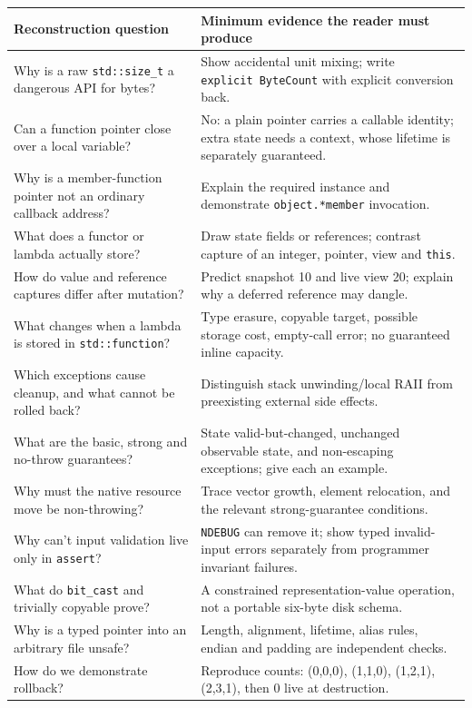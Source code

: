 {\def\LTcaptype{none} %
\begin{longtable}[]{@{}
  >{\raggedright\arraybackslash}p{}
  >{\raggedright\arraybackslash}p{}@{}}
\toprule\noalign{}
\begin{minipage}[b]{\linewidth}\raggedright
Reconstruction question
\end{minipage} & \begin{minipage}[b]{\linewidth}\raggedright
Minimum evidence the reader must produce
\end{minipage} \\
\midrule\noalign{}
\endhead
\bottomrule\noalign{}
\endlastfoot
Why is a raw \texttt{std::size\_t} a dangerous API for bytes? & Show accidental unit mixing; write \texttt{explicit\ ByteCount} with explicit conversion back. \\
Can a function pointer close over a local variable? & No: a plain pointer carries a callable identity; extra state needs a context, whose lifetime is separately guaranteed. \\
Why is a member-function pointer not an ordinary callback address? & Explain the required instance and demonstrate \texttt{object.*member} invocation. \\
What does a functor or lambda actually store? & Draw state fields or references; contrast capture of an integer, pointer, view and \texttt{this}. \\
How do value and reference captures differ after mutation? & Predict snapshot 10 and live view 20; explain why a deferred reference may dangle. \\
What changes when a lambda is stored in \texttt{std::function}? & Type erasure, copyable target, possible storage cost, empty-call error; no guaranteed inline capacity. \\
Which exceptions cause cleanup, and what cannot be rolled back? & Distinguish stack unwinding/local RAII from preexisting external side effects. \\
What are the basic, strong and no-throw guarantees? & State valid-but-changed, unchanged observable state, and non-escaping exceptions; give each an example. \\
Why must the native resource move be non-throwing? & Trace vector growth, element relocation, and the relevant strong-guarantee conditions. \\
Why can't input validation live only in \texttt{assert}? & \texttt{NDEBUG} can remove it; show typed invalid-input errors separately from programmer invariant failures. \\
What do \texttt{bit\_cast} and trivially copyable prove? & A constrained representation-value operation, not a portable six-byte disk schema. \\
Why is a typed pointer into an arbitrary file unsafe? & Length, alignment, lifetime, alias rules, endian and padding are independent checks. \\
How do we demonstrate rollback? & Reproduce counts: (0,0,0), (1,1,0), (1,2,1), (2,3,1), then 0 live at destruction. \\
\end{longtable}
}

